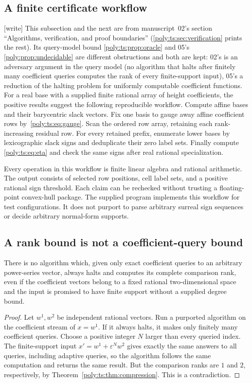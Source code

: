 \documentclass[11pt,a4paper]{article}
\numberwithin{equation}{section}
\theoremstyle{plain}
\newcommand{\wtag}{\textup{[write]}}%
\newcommand{\eps}{\varepsilon}
\begin{document}
\subsection{A finite certificate workflow}\label{poly:ts:sec:workflow}
\noindent\wtag{} This subsection and the next are from manuscript~02's
section ``Algorithms, verification, and proof boundaries''
(\cref{poly:ts:sec:verification} prints the rest). Its query-model bound
\cref{poly:ts:prop:oracle} and 05's \cref{poly:prop:undecidable} are
different obstructions and both are kept: 02's is an adversary argument in
the query model (no algorithm that halts after finitely many coefficient
queries computes the rank of every finite-support input), 05's a reduction
of the halting problem for uniformly computable coefficient functions.
For a real base with a supplied finite rational array of height
coefficients, the positive results suggest the following reproducible
workflow. Compute affine bases and their barycentric slack vectors. Fix
one basis to gauge away affine coefficient rows by~\eqref{poly:ts:eq:gauge}.
Scan the ordered row array, retaining each rank-increasing residual row.
For every retained prefix, enumerate lower bases by lexicographic slack
signs and deduplicate their zero label sets. Finally compute
\eqref{poly:ts:eq:eta} and check the same signs after real rational specialization.

Every operation in this workflow is finite linear algebra and rational
arithmetic. The output consists of selected row positions, cell label
sets, and a positive rational sign threshold. Each claim can be rechecked
without trusting a floating-point convex-hull package. The supplied program
implements this workflow for test configurations. It does not purport to
parse arbitrary surreal sign sequences or decide arbitrary normal-form
supports.

\subsection{A rank bound is not a coefficient-query bound}
\begin{proposition}\label{poly:ts:prop:oracle}
There is no algorithm which, given only exact coefficient queries to an
arbitrary power-series vector, always halts and computes its complete
comparison rank, even if the coefficient vectors belong to a fixed
rational two-dimensional space and the input is promised to have finite
support without a supplied degree bound.
\end{proposition}
\begin{proof}
Let $w^1,w^2$ be independent rational vectors. Run a purported algorithm
on the coefficient stream of $x=w^1$. If it always halts, it makes only
finitely many coefficient queries. Choose a positive integer $N$ larger
than every queried index. The finite-support input
$x'=w^1+\eps^Nw^2$ gives exactly the same answers to all queries, including
adaptive queries, so the algorithm follows the same computation and
returns the same result. But the comparison ranks are $1$ and $2$,
respectively, by Theorem~\ref{poly:ts:thm:compression}. This is a contradiction.
\end{proof}
\end{document}
